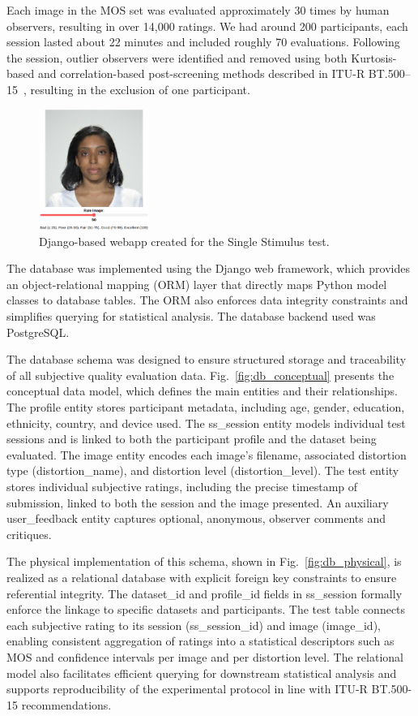 Each image in the MOS set was evaluated approximately 30 times by human observers, resulting in over 14,000 ratings. We had around 200 participants, each session lasted about 22 minutes and included roughly 70 evaluations. Following the session, outlier observers were identified and removed using both Kurtosis-based and correlation-based post-screening methods described in ITU-R BT.500--15~\cite{ITU-R-BT500}, resulting in the exclusion of one participant.

\begin{figure}
    \centering
    \includegraphics[width=0.32\textwidth]{images/webapp_test.png}
    \caption{Django-based webapp created for the Single Stimulus test.}\label{fig:webapp}
\end{figure}

The database was implemented using the Django web framework, which provides an object-relational mapping (ORM) layer that directly maps Python model classes to database tables. The ORM also enforces data integrity constraints and simplifies querying for statistical analysis. The database backend used was PostgreSQL.

The database schema was designed to ensure structured storage and traceability of all subjective quality evaluation data. Fig.~\ref{fig:db_conceptual} presents the conceptual data model, which defines the main entities and their relationships. The profile entity stores participant metadata, including age, gender, education, ethnicity, country, and device used. The ss\_session entity models individual test sessions and is linked to both the participant profile and the dataset being evaluated. The image entity encodes each image's filename, associated distortion type (distortion\_name), and distortion level (distortion\_level). The test entity stores individual subjective ratings, including the precise timestamp of submission, linked to both the session and the image presented. An auxiliary user\_feedback entity captures optional, anonymous, observer comments and critiques.

The physical implementation of this schema, shown in Fig.~\ref{fig:db_physical}, is realized as a relational database with explicit foreign key constraints to ensure referential integrity. The dataset\_id and profile\_id fields in ss\_session formally enforce the linkage to specific datasets and participants. The test table connects each subjective rating to its session (ss\_session\_id) and image (image\_id), enabling consistent aggregation of ratings into a statistical descriptors such as MOS and confidence intervals per image and per distortion level. The relational model also facilitates efficient querying for downstream statistical analysis and supports reproducibility of the experimental protocol in line with ITU-R BT.500-15 recommendations.

